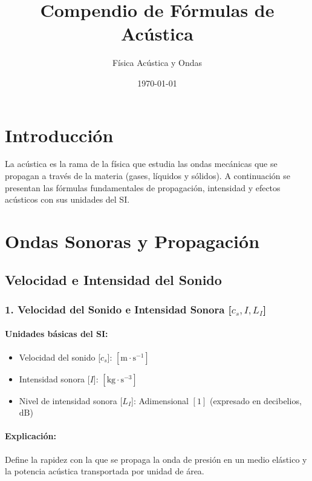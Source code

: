 \documentclass[12pt,a4paper]{article}
\title{\textbf{Compendio de Fórmulas de Acústica}}
\author{Física Acústica y Ondas}
\date{\today}
\begin{document}
\maketitle

\section*{Introducción}
La acústica es la rama de la física que estudia las ondas mecánicas que se propagan a través de la materia (gases, líquidos y sólidos). A continuación se presentan las fórmulas fundamentales de propagación, intensidad y efectos acústicos con sus unidades del SI.

\section{Ondas Sonoras y Propagación}

\subsection{Velocidad e Intensidad del Sonido}

\subsubsection*{1. Velocidad del Sonido e Intensidad Sonora [$c_s, I, L_I$]}
\paragraph*{Unidades básicas del SI:}
\begin{itemize}
    \item Velocidad del sonido [$c_s$]: $[\text{m}\cdot\text{s}^{-1}]$
    \item Intensidad sonora [$I$]: $[\text{kg}\cdot\text{s}^{-3}]$
    \item Nivel de intensidad sonora [$L_I$]: Adimensional $[1]$ (expresado en decibelios, $\text{dB}$)
\end{itemize}
\paragraph*{Explicación:} Define la rapidez con la que se propaga la onda de presión en un medio elástico y la potencia acústica transportada por unidad de área.
\end{document}
